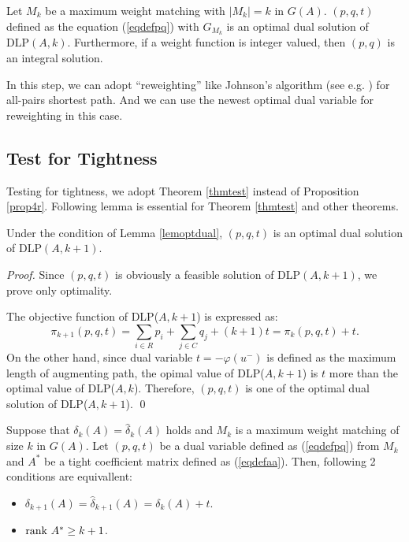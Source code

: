 \begin{lemma}
Let $ M_k $ be a maximum weight matching with $ |M_k| = k $ in $ G(A) $. 
$ ( p,q,t) $ defined as the equation (\ref{eqdefpq}) 
with $ G_{M_k} $ is an optimal dual solution of $ \mathrm{DLP} (A,k) $. 
Furthermore, if a weight function is integer valued, 
then $ (p,q) $ is an integral solution.
\label{lemoptdual}
\end{lemma}

In this step, we can adopt “reweighting” like Johnson's algorithm (see e.g. \cite{AI}) 
for all-pairs shortest path. 
And we can use the newest optimal dual variable for reweighting \cite{TI,TNP} in this case.

\subsection{Test for Tightness}
\label{test}

Testing for tightness, 
we adopt Theorem \ref{thmtest} instead of Proposition \ref{prop4r}.
Following lemma is essential for Theorem \ref{thmtest} and other theorems.

\begin{lemma}
Under the condition of Lemma \ref{lemoptdual}, 
$(p,q,t)$ is an optimal dual solution of $ \mathrm{DLP} (A,k+1) $.
\label{lemoptdualnext}
\end{lemma}

\begin{proof}
Since $ (p,q,t) $ is obviously a feasible solution of DLP$(A,k+1)$, we prove only optimality.

The objective function of DLP($A,k+1$) is expressed as:
\[ \pi_{k+1} (p,q,t) = \sum_{ i \in R } p_i + \sum_{ j \in C} q_j + (k+1) t = \pi_k (p,q,t) + t. \]
On the other hand, since dual variable $t = - \varphi (u^-) $ is defined as the maximum length of augmenting path, 
the opimal value of DLP($A,k+1$) is $t$ more than the optimal value of DLP($A,k$). 
Therefore, $(p,q,t) $ is one of the optimal dual solution of DLP($A,k+1$).  \qed
\end{proof}

\begin{theorem}
Suppose that $ \delta_k (A) = \hat{\delta}_k (A) $ holds 
and $ M_k $ is a maximum weight matching of size $k$ in $G(A)$.
Let $(p,q,t)$ be a dual variable defined as (\ref{eqdefpq}) from $M_k$ 
and $ A^{\ast} $ be a tight coefficient matrix defined as (\ref{eqdefaa}). 
Then, following 2 conditions are equivallent:
\begin{itemize}
\item $\delta_{k+1} (A) = \hat{\delta}_{k+1} (A) = \delta_k (A) + t$.
\item $\mathrm{rank} \  A^{\ast} \ge k + 1 $.
\end{itemize}
\label{thmtest}
\end{theorem}

